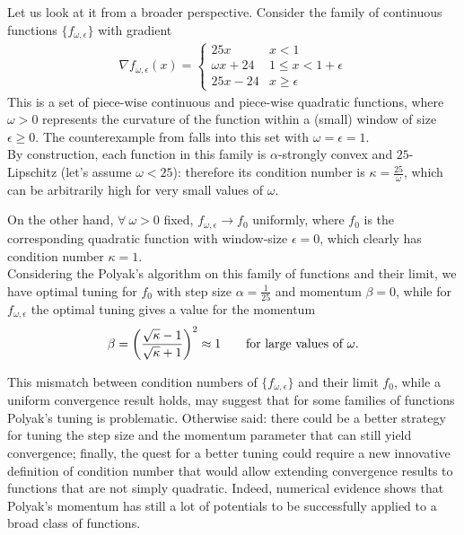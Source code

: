 \documentclass{article}
\begin{document}

Let us look at it from a broader perspective. Consider the family of continuous functions $\{f_{\omega,\epsilon}\}$ with gradient
\begin{gather}
	\nabla f_{\omega, \epsilon}(x) =  \begin{cases}
    25x &   x < 1 \\
    \omega x+24   &  1 \leq x < 1+\epsilon \\
    25x-24 & x \geq \epsilon
\end{cases}
\end{gather}
This is a set of piece-wise continuous and piece-wise quadratic functions, where $\omega >0$ represents the curvature of the function within a (small) window of size $\epsilon \geq0$. The counterexample from \cite{2014arXiv1408.3595L} falls into this set with $\omega =\epsilon = 1$.\\

By construction, each function in this family is $\alpha$-strongly convex and $25$-Lipschitz (let's assume $\omega <25$): therefore its condition number is $\kappa = \frac{25}{\omega}$, which can be arbitrarily high for very small values of $\omega$. 

On the other hand, $\forall \ \omega>0$ fixed, $f_{\omega, \epsilon} \to f_0$ uniformly, where $f_0$ is the corresponding quadratic function with window-size $\epsilon =0$, which clearly has condition number $\kappa = 1$.\\

Considering the Polyak's algorithm on this family of functions and their limit, we have optimal tuning for $f_0$ with step size $\alpha = \frac{1}{25}$ and momentum $\beta = 0$, while for $f_{\omega,\epsilon}$ the optimal tuning gives a value for the momentum 
$$\beta = \left(\dfrac{\sqrt{\kappa} -1}{\sqrt{\kappa}+1}\right)^2 \approx 1 \qquad \text{for large values of } \omega.$$

This mismatch between condition numbers of $\{f_{\omega,\epsilon}\}$ and their limit $f_0$, while a uniform convergence result holds, may suggest that for some families of functions Polyak's tuning is problematic. Otherwise said: there could be a better strategy for tuning the step size and the momentum parameter that can still yield convergence; finally, the quest for a better tuning could require a new innovative definition of condition number that would allow extending convergence results to functions that are not simply quadratic. 
Indeed, numerical evidence shows that Polyak's momentum has still a lot of potentials to be successfully applied to a broad class of functions.
\end{document}
